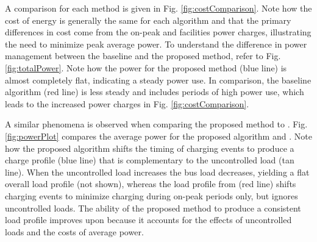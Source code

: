  \par A comparison for each method is given in Fig. \ref{fig:costComparison}. Note how the cost of energy is generally the same for each algorithm and that the primary differences in cost come from the on-peak and facilities power charges, illustrating the need to minimize peak average power. To understand the difference in power management between the baseline and the proposed method, refer to Fig. \ref{fig:totalPower}. Note how the power for the proposed method (blue line) is almost completely flat, indicating a steady power use. In comparison, the baseline algorithm (red line) is less steady and includes periods of high power use, which leads to the increased power charges in Fig. \ref{fig:costComparison}.
 \par A similar phenomena is observed when comparing the proposed method to \cite{He_2019_Fast}. Fig. \ref{fig:powerPlot} compares the average power for the proposed algorithm and \cite{He_2019_Fast}.  Note how the proposed algorithm shifts the timing of charging events to produce a charge profile (blue line) that is complementary to the uncontrolled load (tan line).  When the uncontrolled load increases the bus load decreases, yielding a flat overall load profile (not shown), whereas the load profile from \cite{He_2019_Fast} (red line) shifts charging events to minimize charging during on-peak periods only, but ignores uncontrolled loads. The ability of the proposed method to produce a consistent load profile improves upon \cite{He_2019_Fast} because it accounts for the effects of uncontrolled loads and the costs of average power.  


 
